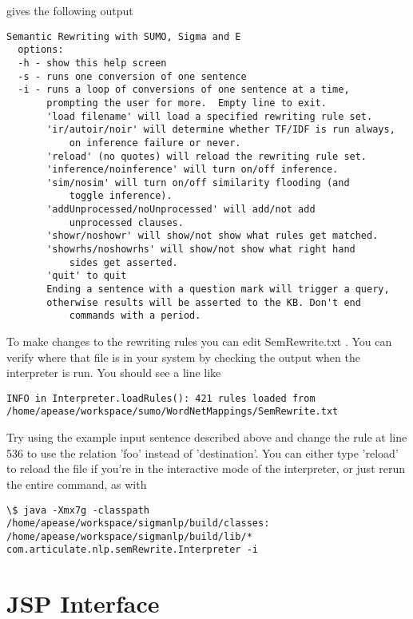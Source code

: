 \documentclass{book}
\begin{document}
gives the following output

\begin{verbatim}
Semantic Rewriting with SUMO, Sigma and E
  options:
  -h - show this help screen
  -s - runs one conversion of one sentence
  -i - runs a loop of conversions of one sentence at a time,
       prompting the user for more.  Empty line to exit.
       'load filename' will load a specified rewriting rule set.
       'ir/autoir/noir' will determine whether TF/IDF is run always, 
           on inference failure or never.
       'reload' (no quotes) will reload the rewriting rule set.
       'inference/noinference' will turn on/off inference.
       'sim/nosim' will turn on/off similarity flooding (and 
           toggle inference).
       'addUnprocessed/noUnprocessed' will add/not add 
           unprocessed clauses.
       'showr/noshowr' will show/not show what rules get matched.
       'showrhs/noshowrhs' will show/not show what right hand 
           sides get asserted.
       'quit' to quit
       Ending a sentence with a question mark will trigger a query,
       otherwise results will be asserted to the KB. Don't end 
           commands with a period.
\end{verbatim}

To make changes to the rewriting rules you can edit SemRewrite.txt .  You can verify
where that file is in your system by checking the output when the interpreter is run.
You should see a line like

\begin{verbatim}
INFO in Interpreter.loadRules(): 421 rules loaded from 
/home/apease/workspace/sumo/WordNetMappings/SemRewrite.txt
\end{verbatim}

Try using the example input sentence described above and change the rule at line 536
to use the relation 'foo' instead of 'destination'.  You can either type 'reload'
to reload the file if you're in the interactive mode of the interpreter, or just rerun
the entire command, as with

\begin{verbatim}
\$ java -Xmx7g -classpath /home/apease/workspace/sigmanlp/build/classes:
/home/apease/workspace/sigmanlp/build/lib/*  
com.articulate.nlp.semRewrite.Interpreter -i
\end{verbatim}

\section{JSP Interface}
\label{chap:KnowEngi:sec:JSPInterface}
\end{document}
